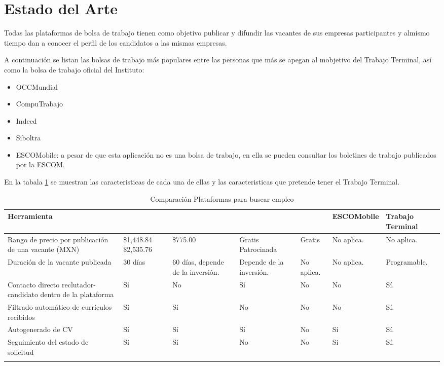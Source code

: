 \clearpage
\section{Estado del Arte}
Todas las plataformas de bolsa de trabajo tienen como objetivo publicar y difundir las vacantes de sus empresas participantes
y almismo tiempo dan a conocer el perfil de los candidatos a las mismas empresas.
\newline

A continuación se listan las bolsas de trabajo más populares entre las personas que más se apegan al mobjetivo del Trabajo Terminal,
 así como  la bolsa de trabajo oficial del Instituto:
\begin{itemize}
    \item OCCMundial
    \item CompuTrabajo
    \item Indeed
    \item Siboltra 
    \item ESCOMobile: a pesar de que esta aplicación no es una bolsa de trabajo, en ella se pueden consultar los boletines de trabajo
    publicados por la ESCOM.
\end{itemize}
En la tabala \ref{table:herramientasSimilares} se muestran las caracteristicas de cada una de ellas y las caracteristicas que pretende tener el Trabajo Terminal.


\begin{longtable}{| p{}  | p{} | p{}  | p{}  | p{}  | p{}  |  p{}  |}

    \hline

    Herramienta & \IUocc{}	& \IUcompuT{} &  \IUIneed & \IUsisae & ESCOMobile  & Trabajo Terminal\\ 
    \hline

    Rango de precio por publicación de una vacante (MXN) &\$1,448.84 \$2,535.76 & \$775.00  &  Gratis Patrocinada &  Gratis  & No aplica. &No aplica.  \\ \hline
    Duración de la vacante publicada &30 días &60 días, depende de la inversión.&Depende de la inversión. &No aplica. &No aplica.& Programable.\\ \hline
    Contacto directo reclutador-candidato dentro de la plataforma &  Sí & No  & Sí  & No  & No & Sí.\\ \hline
    Filtrado automático de currículos recibidos & Sí &  Sí &  No&  No & No & Sí.\\ \hline
    Autogenerado de CV & Sí & Sí & Sí  &  No &Sí & Sí. \\ \hline
    Seguimiento del estado de solicitud &Sí  & Sí & No & No  & Si& Sí. \\ \hline


    \caption{Comparación Plataformas para buscar empleo}
    \label{table:herramientasSimilares}
\end{longtable}